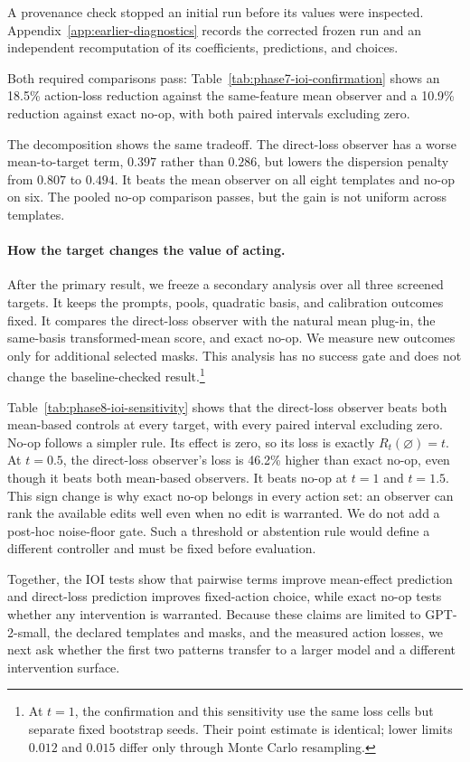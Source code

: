 A provenance check stopped an initial run before its values were inspected.
Appendix~\ref{app:earlier-diagnostics} records the corrected frozen run and an
independent recomputation of its coefficients, predictions, and choices.

Both required comparisons pass: Table~\ref{tab:phase7-ioi-confirmation} shows
an 18.5\% action-loss reduction against the same-feature mean observer and a
10.9\% reduction against exact no-op, with both paired intervals excluding
zero.



The decomposition shows the same tradeoff. The direct-loss observer has a worse
mean-to-target term, $0.397$ rather than $0.286$, but lowers the dispersion
penalty from $0.807$ to $0.494$. It beats the mean observer on all eight
templates and no-op on six. The pooled no-op comparison passes, but the gain is
not uniform across templates.

\paragraph{How the target changes the value of acting.}
After the primary result, we freeze a secondary analysis over all three
screened targets. It keeps the prompts, pools, quadratic basis, and calibration
outcomes fixed. It compares the direct-loss observer with the natural mean plug-in, the
same-basis transformed-mean score, and exact no-op. We measure new outcomes
only for additional selected masks. This analysis has no success gate and does
not change the baseline-checked result.\footnote{At $t=1$, the confirmation and this sensitivity
use the same loss cells but separate fixed bootstrap seeds. Their point
estimate is identical; lower limits $0.012$ and $0.015$ differ only through
Monte Carlo resampling.}



Table~\ref{tab:phase8-ioi-sensitivity} shows that the direct-loss observer beats
both mean-based controls at every target, with every paired interval excluding
zero. No-op follows a simpler rule. Its effect is zero, so its loss is exactly
$R_t(\varnothing)=t$. At $t=0.5$, the direct-loss observer's loss is 46.2\%
higher than exact no-op, even though it beats both mean-based observers. It
beats no-op at $t=1$ and $t=1.5$. This sign change is why exact no-op belongs
in every action set: an observer can rank the available edits well even when
no edit is warranted. We do not add a post-hoc noise-floor gate. Such a
threshold or abstention rule would define a different controller and must be
fixed before evaluation.

\begin{samepage}
Together, the IOI tests show that pairwise terms improve mean-effect prediction
and direct-loss prediction improves fixed-action choice, while exact no-op
tests whether any intervention is warranted.
Because these claims are limited to GPT-2-small, the declared templates and
masks, and the measured action losses, we next ask whether the first two
patterns transfer to a larger model and a different intervention surface.
\end{samepage}
